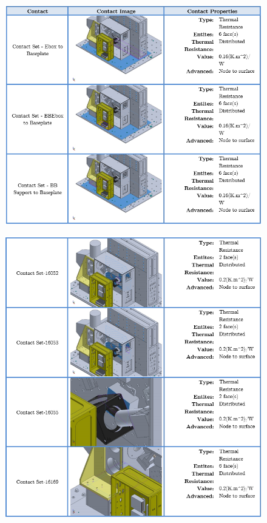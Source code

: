 \begin{figure}
    \centering
    \includegraphics[width=\textwidth]{thermal_load_images/float_TL_images/float_11.PNG}
\end{figure}

\begin{figure}
    \centering
    \includegraphics[width=\textwidth]{thermal_load_images/float_TL_images/float_12.PNG}
\end{figure}


